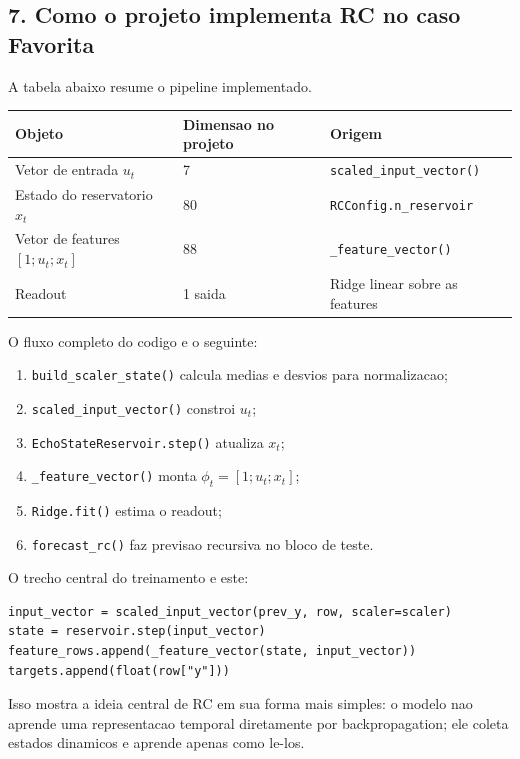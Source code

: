 \documentclass[12pt]{article}
\providecommand{\tightlist}{%
          \setlength{\itemsep}{0pt}\setlength{\parskip}{0pt}}
\begin{document}
\subsection{7. Como o projeto implementa RC no caso Favorita}\label{7-como-o-projeto-implementa-rc-no-caso-favorita}

A tabela abaixo resume o pipeline implementado.

\begin{longtable}[]{@{}lll@{}}
\toprule\noalign{}
Objeto & Dimensao no projeto & Origem \\
\midrule\noalign{}
\endhead
\bottomrule\noalign{}
\endlastfoot
Vetor de entrada \(u_t\) & 7 & \texttt{scaled\_input\_vector()} \\
Estado do reservatorio \(x_t\) & 80 & \texttt{RCConfig.n\_reservoir} \\
Vetor de features \([1; u_t; x_t]\) & 88 & \texttt{\_feature\_vector()} \\
Readout & 1 saida & Ridge linear sobre as features \\
\end{longtable}

O fluxo completo do codigo e o seguinte:

\begin{enumerate}
\def\labelenumi{\arabic{enumi}.}
\tightlist
\item
  \texttt{build\_scaler\_state()} calcula medias e desvios para normalizacao;
\item
  \texttt{scaled\_input\_vector()} constroi \(u_t\);
\item
  \texttt{EchoStateReservoir.step()} atualiza \(x_t\);
\item
  \texttt{\_feature\_vector()} monta \(\phi_t = [1; u_t; x_t]\);
\item
  \texttt{Ridge.fit()} estima o readout;
\item
  \texttt{forecast\_rc()} faz previsao recursiva no bloco de teste.
\end{enumerate}

O trecho central do treinamento e este:

\begin{verbatim}
input_vector = scaled_input_vector(prev_y, row, scaler=scaler)
state = reservoir.step(input_vector)
feature_rows.append(_feature_vector(state, input_vector))
targets.append(float(row["y"]))
\end{verbatim}

Isso mostra a ideia central de RC em sua forma mais simples: o modelo nao aprende uma representacao temporal diretamente por backpropagation; ele coleta estados dinamicos e aprende apenas como le-los.
\end{document}
